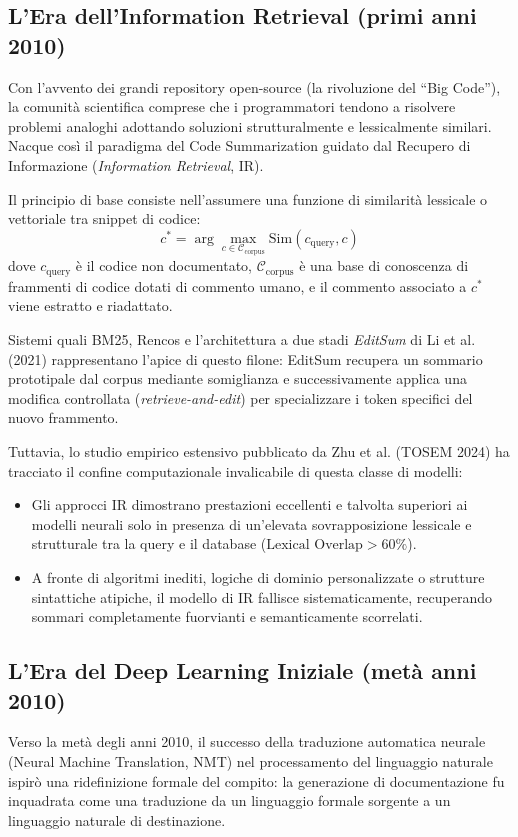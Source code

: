 \subsection{L'Era dell'Information Retrieval (primi anni 2010)}
\label{subsec:era_ir}
Con l'avvento dei grandi repository open-source (la rivoluzione del ``Big Code''), la comunità scientifica comprese che i programmatori tendono a risolvere problemi analoghi adottando soluzioni strutturalmente e lessicalmente similari. Nacque così il paradigma del Code Summarization guidato dal Recupero di Informazione (\emph{Information Retrieval}, IR).

Il principio di base consiste nell'assumere una funzione di similarità lessicale o vettoriale tra snippet di codice:
\begin{equation}
    c^* = \arg\max_{c \in \mathcal{C}_{\mathrm{corpus}}} \mathrm{Sim}(c_{\mathrm{query}}, c)
    \label{eq:ir_similarity}
\end{equation}
dove $c_{\mathrm{query}}$ è il codice non documentato, $\mathcal{C}_{\mathrm{corpus}}$ è una base di conoscenza di frammenti di codice dotati di commento umano, e il commento associato a $c^*$ viene estratto e riadattato.

Sistemi quali BM25, Rencos e l'architettura a due stadi \emph{EditSum} di Li et al. (2021) \cite{li_editsum_2021} rappresentano l'apice di questo filone: EditSum recupera un sommario prototipale dal corpus mediante somiglianza e successivamente applica una modifica controllata (\emph{retrieve-and-edit}) per specializzare i token specifici del nuovo frammento.

Tuttavia, lo studio empirico estensivo pubblicato da Zhu et al. (TOSEM 2024) \cite{zhu_deep_2024} ha tracciato il confine computazionale invalicabile di questa classe di modelli:
\begin{itemize}[leftmargin=*, label=\textbullet]
    \item Gli approcci IR dimostrano prestazioni eccellenti e talvolta superiori ai modelli neurali solo in presenza di un'elevata sovrapposizione lessicale e strutturale tra la query e il database ($\text{Lexical Overlap} > 60\%$).
    \item A fronte di algoritmi inediti, logiche di dominio personalizzate o strutture sintattiche atipiche, il modello di IR fallisce sistematicamente, recuperando sommari completamente fuorvianti e semanticamente scorrelati.
\end{itemize}

\subsection{L'Era del Deep Learning Iniziale (metà anni 2010)}
\label{subsec:era_deep_learning}
Verso la metà degli anni 2010, il successo della traduzione automatica neurale (Neural Machine Translation, NMT) nel processamento del linguaggio naturale ispirò una ridefinizione formale del compito: la generazione di documentazione fu inquadrata come una traduzione da un linguaggio formale sorgente a un linguaggio naturale di destinazione.

